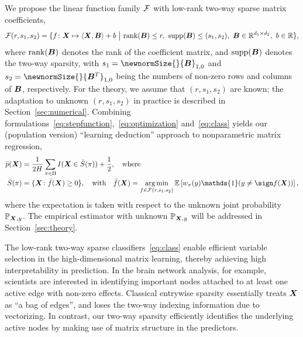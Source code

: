\documentclass[12pt]{article}
\begin{document}
We propose the linear function family $\mathcal{F}$ with low-rank two-way sparse matrix coefficients,
\begin{align}\label{eq:class}
\tF(r,s_1,s_2)=\{f\colon \mX\mapsto \langle \mX, \mB \rangle +b \ \big|\ \text{rank}(\mB)\leq r, \ \text{supp}(\mB)\leq (s_1,s_2), \ \mB\in\mathbb{R}^{d_1\times d_2},\ b\in\mathbb{R}\},
\end{align}
where $\text{rank}(\bm B)$ denotes the rank of the coefficient matrix, and $\text{supp}(\bm B)$ denotes the two-way sparsity, with $s_1=\newnormSize{}{\mB}_{1,0}$ and $s_2=\newnormSize{}{\mB^T}_{1,0}$ being the numbers of non-zero rows and columns of $\bm B$, respectively. For the theory, we assume that $(r,s_1,s_2)$ are known; the adaptation to unknown $(r, s_1, s_2)$ in practice is described in Section~\ref{sec:numerical}.  
Combining formulations~\eqref{eq:stepfunction},~\eqref{eq:optimization} and~\eqref{eq:class} yields our (population version) ``learning deduction'' approach to nonparametric matrix regression, 
\begin{align}\label{eq:proposal}
\bar p(\mX) &= {1\over 2H}  \sum_{\pi \in \Pi} I(\mX\in \bar S(\pi))+{1\over 2}, \quad \text{where}\\
\bar S(\pi) &= \{\mX\colon\bar f(\mX)\geq 0\},\quad  \text{with}\quad  \bar f(\mX)= \argmin_{f\in\tF(r,s_1,s_2)}\mathbb{E}\left[w_\pi(y)\mathds{1}(y\neq \sign f(\mX))\right],
\end{align}
where the expectation is taken with respect to the unknown joint probability $\mathbb{P}_{\bm X,y}$. The empirical estimator with unknown $\mathbb{P}_{\bm X,y}$ will be addressed in Section~\ref{sec:theory}. 

The low-rank two-way sparse classifiers~\eqref{eq:class} enable efficient variable selection in the high-dimensional matrix learning, thereby achieving high interpretability in prediction. In the brain network analysis, for example, scientists are interested in identifying important nodes attached to at least one active edge with non-zero effects. Classical entrywise sparsity essentially treats $\bm X$ as ``a bag of edges'', and loses the two-way indexing information due to vectorizing. In contrast, our two-way sparsity efficiently identifies the underlying active nodes by making use of matrix structure in the predictors. 
\end{document}
